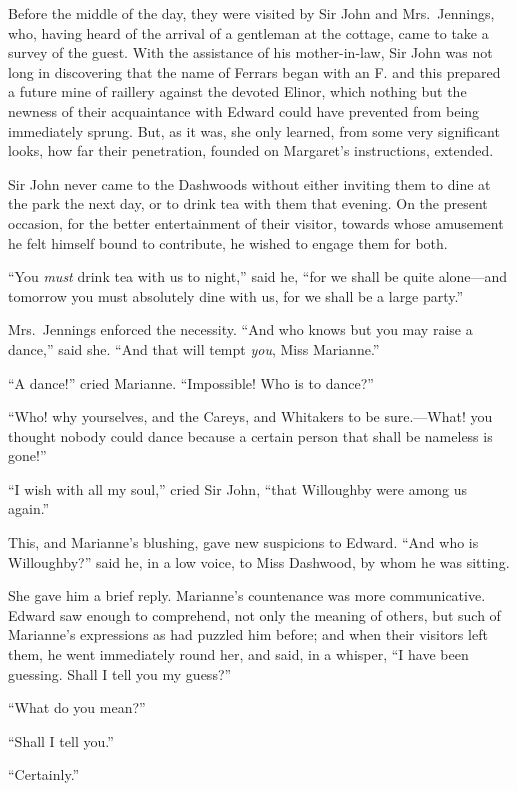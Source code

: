 \documentclass{article}
\begin{document}
Before the middle of the day, they were visited by Sir
John and Mrs.\ Jennings, who, having heard of the arrival
of a gentleman at the cottage, came to take a survey
of the guest.  With the assistance of his mother-in-law,
Sir John was not long in discovering that the name of
Ferrars began with an F. and this prepared a future mine
of raillery against the devoted Elinor, which nothing but
the newness of their acquaintance with Edward could have
prevented from being immediately sprung.  But, as it was,
she only learned, from some very significant looks, how far
their penetration, founded on Margaret's instructions, extended.

Sir John never came to the Dashwoods without either
inviting them to dine at the park the next day, or to drink
tea with them that evening.  On the present occasion,
for the better entertainment of their visitor, towards
whose amusement he felt himself bound to contribute,
he wished to engage them for both.

``You \emph{must} drink tea with us to night,'' said he,
``for we shall be quite alone---and tomorrow you must
absolutely dine with us, for we shall be a large party.''

Mrs.\ Jennings enforced the necessity.  ``And who knows
but you may raise a dance,'' said she.  ``And that will
tempt \emph{you}, Miss Marianne.''

``A dance!'' cried Marianne.  ``Impossible! Who is to dance?''

``Who! why yourselves, and the Careys, and Whitakers
to be sure.---What! you thought nobody could dance
because a certain person that shall be nameless is gone!''

``I wish with all my soul,'' cried Sir John,
``that Willoughby were among us again.''

This, and Marianne's blushing, gave new suspicions
to Edward.  ``And who is Willoughby?'' said he, in a low voice,
to Miss Dashwood, by whom he was sitting.

She gave him a brief reply.  Marianne's countenance
was more communicative.  Edward saw enough to comprehend,
not only the meaning of others, but such of Marianne's
expressions as had puzzled him before; and when their
visitors left them, he went immediately round her, and said,
in a whisper, ``I have been guessing.  Shall I tell you
my guess?''

``What do you mean?''

``Shall I tell you.''

``Certainly.''
\end{document}

